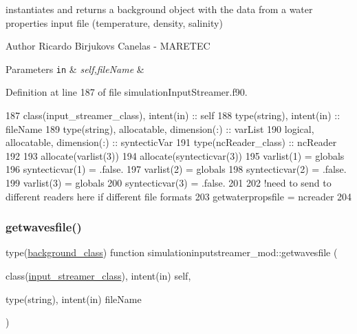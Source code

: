 instantiates and returns a background object with the data from a water properties input file (temperature, density, salinity) 

\begin{DoxyAuthor}{Author}
Ricardo Birjukovs Canelas -\/ M\+A\+R\+E\+T\+EC 
\end{DoxyAuthor}

\begin{DoxyParams}[1]{Parameters}
\mbox{\tt in}  & {\em self,file\+Name} & \\
\hline
\end{DoxyParams}


Definition at line 187 of file simulation\+Input\+Streamer.\+f90.


\begin{DoxyCode}
187     \textcolor{keywordtype}{class}(input\_streamer\_class), \textcolor{keywordtype}{intent(in)} :: self
188     \textcolor{keywordtype}{type}(string), \textcolor{keywordtype}{intent(in)} :: fileName
189     \textcolor{keywordtype}{type}(string), \textcolor{keywordtype}{allocatable}, \textcolor{keywordtype}{dimension(:)} :: varList
190     \textcolor{keywordtype}{logical}, \textcolor{keywordtype}{allocatable}, \textcolor{keywordtype}{dimension(:)} :: syntecticVar
191     \textcolor{keywordtype}{type}(ncReader\_class) :: ncReader
192 
193     \textcolor{keyword}{allocate}(varlist(3))
194     \textcolor{keyword}{allocate}(syntecticvar(3))
195     varlist(1) = globals%
196     syntecticvar(1) = .false.
197     varlist(2) = globals%
198     syntecticvar(2) = .false.
199     varlist(3) = globals%
200     syntecticvar(3) = .false.
201 
202     \textcolor{comment}{!need to send to different readers here if different file formats}
203     getwaterpropsfile = ncreader%
204 
\end{DoxyCode}
\mbox{\label{namespacesimulationinputstreamer__mod_a28ca430c32786d6df906f295bedf54df}} 
\subsubsection{\texorpdfstring{getwavesfile()}{getwavesfile()}}
{\footnotesize\ttfamily type(\mbox{\hyperlink{structbackground__mod_1_1background__class}{background\+\_\+class}}) function simulationinputstreamer\+\_\+mod\+::getwavesfile (\begin{DoxyParamCaption}\item[{class(\mbox{\hyperlink{structsimulationinputstreamer__mod_1_1input__streamer__class}{input\+\_\+streamer\+\_\+class}}), intent(in)}]{self,  }\item[{type(string), intent(in)}]{file\+Name }\end{DoxyParamCaption})\hspace{0.3cm}{\ttfamily [private]}}



